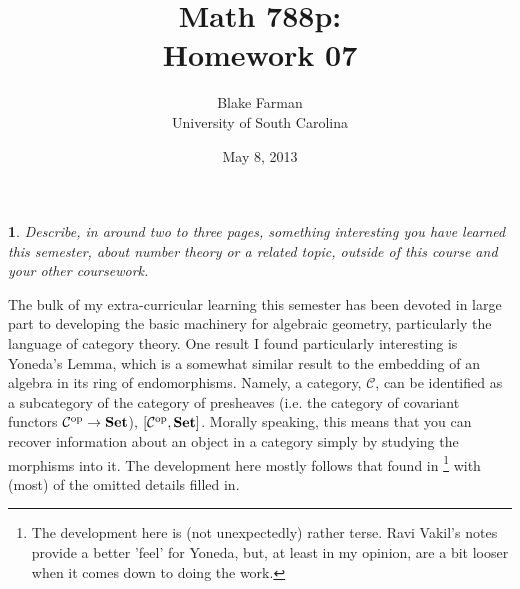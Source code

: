 \documentclass[10pt]{amsart}
\author{Blake Farman\\University of South Carolina}
\title{Math 788p:\\Homework 07}
\date{May 8, 2013}
\begin{document}
\maketitle

\providecommand{\p}{\mathfrak{p}}
\providecommand{\m}{\mathfrak{m}}
\newcommand{\legendre}[2]{\left(\frac{#1}{#2}\right)}
\theoremstyle{plain}
\newtheorem{thm}{}
\newtheorem{lem}{Lemma}
\theoremstyle{definition}
\newtheorem{defn}{Definition}
\newtheorem{prop}{Proposition}
\newtheorem{cor}{Corollary}

\setcounter{thm}{6}

\begin{thm}
  Describe, in around two to three pages, something interesting you have learned this semester, about number theory or a related topic, outside of this course and your other coursework.
\end{thm}

The bulk of my extra-curricular learning this semester has been devoted in large part to developing the basic machinery for algebraic geometry, particularly the language of category theory.  
One result I found particularly interesting is Yoneda's Lemma, which is a somewhat similar result to the embedding of an algebra in its ring of endomorphisms.
Namely, a category, $\mathcal{C}$, can be identified as a subcategory of the category of presheaves (i.e. the category of covariant functors $\mathcal{C}^\text{op} \rightarrow {\bf Set}$), $[\mathcal{C}^\text{op}, {\bf Set}]$.
Morally speaking, this means that you can recover information about an object in a category simply by studying the morphisms into it.
The development here mostly follows that found in \cite{lane1998categories}\footnote{The development here is (not unexpectedly) rather terse.  Ravi Vakil's notes provide a better 'feel' for Yoneda, but, at least in my opinion, are a bit looser when it comes down to doing the work.} with (most) of the omitted details filled in.
\end{document}
